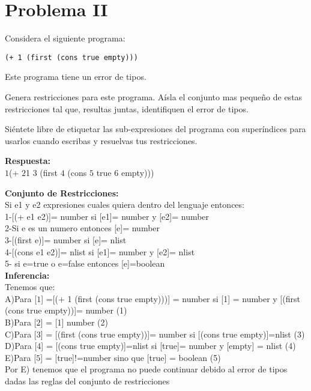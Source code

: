 \documentclass{article}
\begin{document}
\section*{Problema II}
Considera el siguiente programa:

\begin{verbatim}
(+ 1 (first (cons true empty)))
\end{verbatim}

Este programa tiene un error de tipos.

Genera restricciones para este programa. Aísla el conjunto mas pequeño de
estas restricciones tal que, resultas juntas, identifiquen el error de tipos.

Siéntete libre de etiquetar las sub-expresiones del programa con superíndices
para usarlos cuando escribas y resuelvas tus restricciones.

\textbf {Respuesta: }
\\
$\boxed{1}$(+ $\boxed{2}$1  $\boxed{3}$ (first $\boxed{4}$ (cons $\boxed{5}$ true $\boxed{6}$ empty)))

\textbf {Conjunto de Restricciones: }
\\
Si e1 y e2 expresiones cuales quiera dentro del lenguaje entonces:
 \\
 1-[(+ e1 e2)]= number si [e1]= number y [e2]= number
 \\
 2-Si e es un numero entonces [e]= number
 \\
 3-[(first e)]= number si [e]= nlist
 \\
 4-[(cons e1 e2)]= nlist si [e1]= number y [e2]= nlist
 \\
 5- si e=true o e=false entonces [e]=boolean 
 \\
\textbf{Inferencia: }
  \\
  Tenemos que: 
  \\
  A)Para [$\boxed{1}$] =[(+ 1 (first (cons true empty)))] = number si [1] = number y [(first (cons true empty))]= number (1)\\ 
  B)Para [$\boxed{2}$] = [1] number (2)\\
  C)Para [$\boxed{3}$] = [(first (cons true empty))]= number si [(cons true empty)]=nlist (3)\\
  D)Para [$\boxed{4}$] = [(cons true empty)]=nlist si [true]= number y [empty] = nlist (4)\\
  E)Para [$\boxed{5}$] = [true]!=number sino que [true] = boolean (5)\\
  Por E) tenemos que el programa no puede continuar debido al error de tipos dadas las reglas del conjunto de restricciones
    
\end{document}
